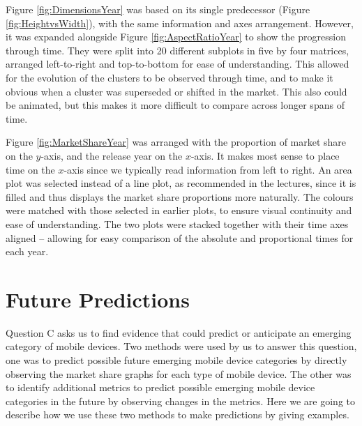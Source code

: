 \documentclass[conference]{IEEEtran}
\begin{document}
Figure \ref{fig:DimensionsYear}
was based on its single predecessor (Figure \ref{fig:HeightvsWidth}), with the
same information and axes arrangement.
However, it was expanded alongside
Figure \ref{fig:AspectRatioYear}
to show the progression through time. They were split into 20 different
subplots in five by four matrices, arranged left-to-right and top-to-bottom for ease of
understanding. This allowed for the evolution of the clusters to be observed
through time, and to make it obvious when a cluster was superseded or shifted in
the market. This also could be animated, but this makes it more difficult to
compare across longer spans of time.

Figure \ref{fig:MarketShareYear}
was arranged with the proportion of market share on the $y$-axis, and the release year on the $x$-axis.
It makes most sense to place time on the $x$-axis since we typically read
information from left to right.
An area plot was selected instead of a line plot, as recommended in the lectures,
since it is filled and thus displays the market share proportions more naturally.
The colours were matched with those selected in earlier plots, to ensure visual continuity and ease of understanding.
The two plots were stacked together with their time axes aligned -- allowing for easy comparison of the absolute and proportional times for each year.

\section{Future Predictions}
Question C asks us to find evidence that could predict or anticipate an emerging category of mobile devices. Two methods were used by us to answer this question, one was to predict possible future emerging mobile device categories by directly observing the market share graphs for each type of mobile device. The other was to identify additional metrics to predict possible emerging mobile device categories in the future by observing changes in the metrics. Here we are going to describe how we use these two methods to make predictions by giving examples.
\end{document}
